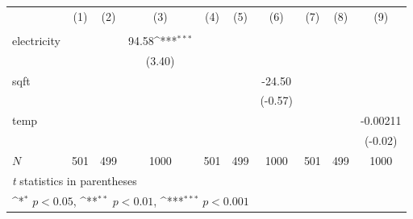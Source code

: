 {
\def\sym#1{\ifmmode^{#1}\else\(^{#1}\)\fi}
\begin{tabular}{l*{9}{c}}
\hline\hline
            &\multicolumn{1}{c}{(1)}&\multicolumn{1}{c}{(2)}&\multicolumn{1}{c}{(3)}&\multicolumn{1}{c}{(4)}&\multicolumn{1}{c}{(5)}&\multicolumn{1}{c}{(6)}&\multicolumn{1}{c}{(7)}&\multicolumn{1}{c}{(8)}&\multicolumn{1}{c}{(9)}\\
            &\multicolumn{1}{c}{} &\multicolumn{1}{c}{} &\multicolumn{1}{c}{} &\multicolumn{1}{c}{} &\multicolumn{1}{c}{} &\multicolumn{1}{c}{} &\multicolumn{1}{c}{} &\multicolumn{1}{c}{} &\multicolumn{1}{c}{} \\
\hline
electricity &                     &                     &       94.58\sym{***}&                     &                     &                     &                     &                     &                     \\
            &                     &                     &      (3.40)         &                     &                     &                     &                     &                     &                     \\
[1em]
sqft        &                     &                     &                     &                     &                     &      -24.50         &                     &                     &                     \\
            &                     &                     &                     &                     &                     &     (-0.57)         &                     &                     &                     \\
[1em]
temp        &                     &                     &                     &                     &                     &                     &                     &                     &    -0.00211         \\
            &                     &                     &                     &                     &                     &                     &                     &                     &     (-0.02)         \\
\hline
\(N\)       &         501         &         499         &        1000         &         501         &         499         &        1000         &         501         &         499         &        1000         \\
\hline\hline
\multicolumn{10}{l}{\footnotesize \textit{t} statistics in parentheses}\\
\multicolumn{10}{l}{\footnotesize \sym{*} \(p<0.05\), \sym{**} \(p<0.01\), \sym{***} \(p<0.001\)}\\
\end{tabular}
}
